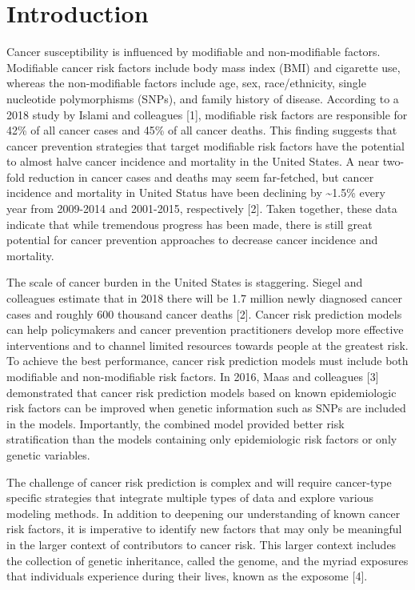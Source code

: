\documentclass[12pt,oneside]{reedthesis}
\theoremstyle{definition}
\theoremstyle{definition}
\theoremstyle{definition}
\theoremstyle{remark}
\begin{document}
\mainmatter %
\pagestyle{fancyplain} %

\hypertarget{introduction}{%
\section*{Introduction}\label{introduction}}

Cancer susceptibility is influenced by modifiable and non-modifiable
factors. Modifiable cancer risk factors include body mass index (BMI)
and cigarette use, whereas the non-modifiable factors include age, sex,
race/ethnicity, single nucleotide polymorphisms (SNPs), and family
history of disease. According to a 2018 study by Islami and colleagues
{[}1{]}, modifiable risk factors are responsible for 42\% of all cancer
cases and 45\% of all cancer deaths. This finding suggests that cancer
prevention strategies that target modifiable risk factors have the
potential to almost halve cancer incidence and mortality in the United
States. A near two-fold reduction in cancer cases and deaths may seem
far-fetched, but cancer incidence and mortality in United Status have
been declining by \textasciitilde{}1.5\% every year from 2009-2014 and
2001-2015, respectively {[}2{]}. Taken together, these data indicate
that while tremendous progress has been made, there is still great
potential for cancer prevention approaches to decrease cancer incidence
and mortality.

The scale of cancer burden in the United States is staggering. Siegel
and colleagues estimate that in 2018 there will be 1.7 million newly
diagnosed cancer cases and roughly 600 thousand cancer deaths {[}2{]}.
Cancer risk prediction models can help policymakers and cancer
prevention practitioners develop more effective interventions and to
channel limited resources towards people at the greatest risk. To
achieve the best performance, cancer risk prediction models must include
both modifiable and non-modifiable risk factors. In 2016, Maas and
colleagues {[}3{]} demonstrated that cancer risk prediction models based
on known epidemiologic risk factors can be improved when genetic
information such as SNPs are included in the models. Importantly, the
combined model provided better risk stratification than the models
containing only epidemiologic risk factors or only genetic variables.

The challenge of cancer risk prediction is complex and will require
cancer-type specific strategies that integrate multiple types of data
and explore various modeling methods. In addition to deepening our
understanding of known cancer risk factors, it is imperative to identify
new factors that may only be meaningful in the larger context of
contributors to cancer risk. This larger context includes the collection
of genetic inheritance, called the genome, and the myriad exposures that
individuals experience during their lives, known as the exposome
{[}4{]}.
\end{document}
